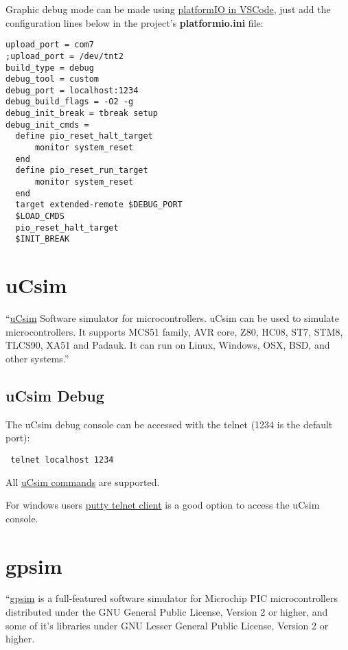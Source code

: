 Graphic debug mode can be made using \href{https://platformio.org/}{platformIO in VSCode}, just add the configuration lines below in the project's \textbf{platformio.ini} file:
\begin{verbatim}
upload_port = com7
;upload_port = /dev/tnt2
build_type = debug
debug_tool = custom
debug_port = localhost:1234
debug_build_flags = -O2 -g
debug_init_break = tbreak setup
debug_init_cmds =
  define pio_reset_halt_target
      monitor system_reset
  end
  define pio_reset_run_target
      monitor system_reset
  end
  target extended-remote $DEBUG_PORT
  $LOAD_CMDS
  pio_reset_halt_target
  $INIT_BREAK
\end{verbatim}
 
 
\section{uCsim} \hypertarget{def:ucsim}{}
``\href{http://mazsola.iit.uni-miskolc.hu/\%7edrdani/embedded/ucsim/}{uCsim} Software simulator for microcontrollers. uCsim can be used to simulate microcontrollers. It supports MCS51 family, AVR core, Z80, HC08, ST7, STM8, TLCS90, XA51 and Padauk. It can run on Linux, Windows, OSX, BSD, and other systems.''

\subsection{uCsim Debug} \hypertarget{def:ucsim}{}
  
The uCsim debug console can be accessed with the telnet (1234 is the default port):
 \begin{verbatim}
 telnet localhost 1234
 \end{verbatim}
 
All \href{http://mazsola.iit.uni-miskolc.hu/\%7edrdani/embedded/ucsim/cmd.html}{uCsim commands} are supported.  

For windows users \href{https://www.putty.org/}{putty telnet client} is a good option to access the uCsim console. 
 
  
\section{gpsim} \hypertarget{def:gpsim}{}

``\href{http://gpsim.sourceforge.net/}{gpsim} is a full-featured software simulator for Microchip PIC microcontrollers distributed under the GNU General Public License, Version 2 or higher, and some of it's libraries under GNU Lesser General Public License, Version 2 or higher.

